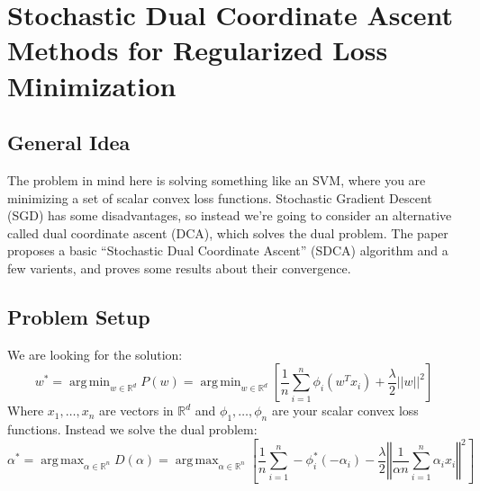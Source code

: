 \documentclass[12pt]{report}
\DeclareMathOperator*{\argmin}{arg\,min}
\DeclareMathOperator*{\argmax}{arg\,max}
\begin{document}

\maketitle

\vspace*{.1in}



\section{Stochastic Dual Coordinate Ascent Methods for Regularized Loss Minimization}

\subsection{General Idea}
The problem in mind here is solving something like an SVM, where you are minimizing a set of scalar convex loss functions.  Stochastic Gradient Descent (SGD) has some disadvantages, so instead we're going to consider an alternative called dual coordinate ascent (DCA), which solves the dual problem.  The paper proposes a basic ``Stochastic Dual Coordinate Ascent'' (SDCA) algorithm and a few varients, and proves some results about their convergence.

\subsection{Problem Setup}
We are looking for the solution:
\begin{equation}\label{primal}
	w^*=\argmin_{w\in\mathbb{R}^d} P(w) = \argmin_{w\in\mathbb{R}^d}\left[
		\frac1n \sum_{i=1}^n \phi_i(w^T x_i) + \frac\lambda2||w||^2
	\right]
\end{equation}
Where $x_1, \ldots, x_n$ are vectors in $\mathbb{R}^d$ and $\phi_1,\ldots, \phi_n$ are your scalar convex loss functions. Instead we solve the dual problem:
\begin{equation}\label{dual}
	\alpha^*=\argmax_{\alpha\in\mathbb{R}^n} D(\alpha)
	= \argmax_{\alpha\in\mathbb{R}^n} \left[
		\frac1n\sum_{i=1}^n-\phi_i^*(-\alpha_i)-\frac\lambda2\left\Vert\frac1{\alpha n}\sum_{i=1}^n\alpha_ix_i\right\Vert^2
		\right]
\end{equation}\label{dual}
\end{document}
